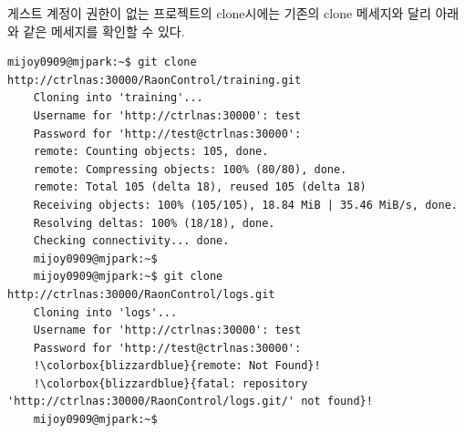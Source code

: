 \documentclass[11pt
  , a4paper
  , article
  , oneside
]{memoir}
\begin{document}
게스트 계정이 권한이 없는 프로젝트의 clone시에는 기존의 clone 메세지와 달리 아래와 같은 메세지를 확인할 수 있다.
{\scriptsize
	\begin{lstlisting}[style=termstyle, escapechar=!]
	mijoy0909@mjpark:~$ git clone http://ctrlnas:30000/RaonControl/training.git
	Cloning into 'training'...
	Username for 'http://ctrlnas:30000': test
	Password for 'http://test@ctrlnas:30000': 
	remote: Counting objects: 105, done.
	remote: Compressing objects: 100% (80/80), done.
	remote: Total 105 (delta 18), reused 105 (delta 18)
	Receiving objects: 100% (105/105), 18.84 MiB | 35.46 MiB/s, done.
	Resolving deltas: 100% (18/18), done.
	Checking connectivity... done.
	mijoy0909@mjpark:~$ 
	mijoy0909@mjpark:~$ git clone http://ctrlnas:30000/RaonControl/logs.git
	Cloning into 'logs'...
	Username for 'http://ctrlnas:30000': test
	Password for 'http://test@ctrlnas:30000': 
	!\colorbox{blizzardblue}{remote: Not Found}!
	!\colorbox{blizzardblue}{fatal: repository 'http://ctrlnas:30000/RaonControl/logs.git/' not found}!
	mijoy0909@mjpark:~$ 
	\end{lstlisting}
}

\clearpage
\end{document}
